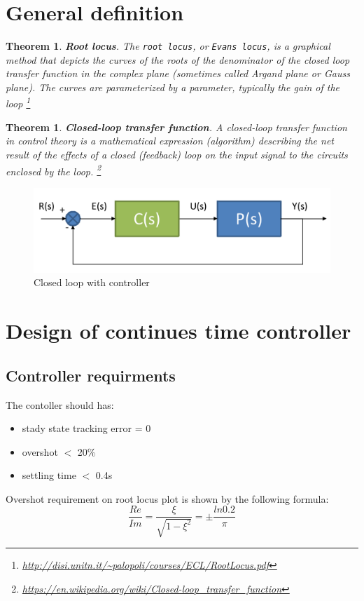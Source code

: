 \documentclass[a4paper,12pt,oneside]{article}
\newtheorem{thm}[equation]{Theorem}
\begin{document}
\section{General definition}

\begin{thm}
\textbf{Root locus}. The \texttt{root locus}, or \texttt{Evans locus}, is a graphical method that
depicts the curves of the roots of the denominator of the closed loop transfer function in the complex plane
(sometimes called Argand plane or Gauss plane). The curves are parameterized by a parameter, typically the
gain of the loop  \footnote{\url{http://disi.unitn.it/~palopoli/courses/ECL/RootLocus.pdf}}
\end{thm}
\begin{thm}
\textbf{Closed-loop transfer function}. A closed-loop transfer function in control theory is a mathematical expression (algorithm) describing the net result of the effects of a closed (feedback) loop on the input signal to the circuits enclosed by the loop. \footnote{\url{https://en.wikipedia.org/wiki/Closed-loop_transfer_function}}
\end{thm}

\begin{figure}[h]
	\vspace{-1.5em}
	\centering
	\includegraphics[width=\columnwidth]{./closed_loop_controller.png}
	\vspace{-1.5em}
	\caption{Closed loop with controller}
	\label{fig:closed_loop_controller}
	\vspace{-2em}
\end{figure}

\section{Design of continues time controller}
\subsection{Controller requirments}
The contoller should has:
\begin{itemize}
\item stady state tracking error = 0
\item overshot $<$ 20\%
\item settling time $<$ 0.4s
\end{itemize}
Overshot requirement on root locus plot is shown by the following formula:
\begin{equation}
\frac{Re}{Im} = \frac{\xi}{\sqrt{1-\xi^{2}}} = \pm\frac{ln{0.2}}{\pi}
\end{equation}
\end{document}
